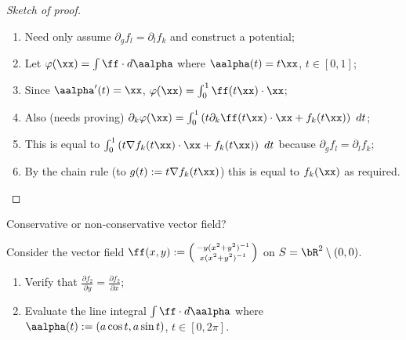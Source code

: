     

    \begin{proof}[Sketch of proof]
        \begin{enumerate}
            \item Need only assume \(\partial_g f_l = \partial_l f_k\) and construct a potential;
            \item Let \(\varphi(\xx) = \int \ff \cdot d\aalpha\) where \(\aalpha(t) = t\xx\), \(t\in[0,1]\);
            \item Since \(\aalpha'(t) = \xx\), \(\varphi(\xx) = \int_0^1 \ff(t\xx)\cdot \xx\);
            \item Also (needs proving) \(\partial_k  \varphi(\xx) = \int_{0}^{1} \left( t \partial_k \ff(t\xx) \cdot \xx + f_k(t\xx) \right) \ dt\);
            \item This is equal to \(\int_{0}^{1} \left( t \nabla f_k(t\xx) \cdot \xx + f_k(t\xx) \right) \ dt\) because  \(\partial_g f_l = \partial_l f_k\);
            \item By the chain rule (to \(g(t):= t \nabla f_k(t\xx) \)) this is equal to \(f_k(\xx)\) as required.
        \end{enumerate}
        
    \end{proof}




    {Conservative or non-conservative vector field?}


    \begin{example}
        Consider the vector field \(\ff(x,y) := \left(\begin{smallmatrix}
            -y (x^2 + y^2)^{-1} \\ x (x^2 + y^2)^{-1}
        \end{smallmatrix}\right)\)
        on \(S = \bR^2 \setminus (0,0)\).
        \begin{enumerate}
            \item Verify that \(  \tfrac{\partial f_2}{\partial y} = \tfrac{\partial f_2}{\partial x}\);
            \item Evaluate the line integral \(\int \ff \cdot d\aalpha\) where \(\aalpha(t) := (a \cos t, a \sin t)\), \(t\in [0,2\pi]\).
        \end{enumerate}

    \end{example}


